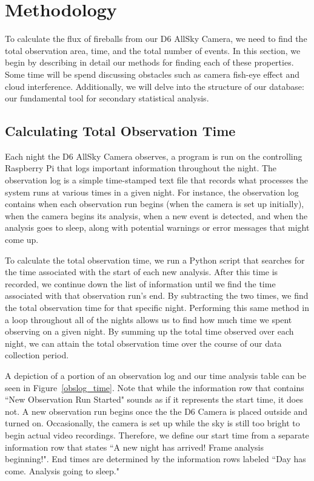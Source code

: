 

\chapter{Methodology}

To calculate the flux of fireballs from our D6 AllSky Camera, we need to find the total observation area, time, and the total number of events.
In this section, we begin by describing in detail our methods for finding each of these properties.
Some time will be spend discussing obstacles such as camera fish-eye effect and cloud interference.  
Additionally, we will delve into the structure of our database: our fundamental tool for secondary statistical analysis.

\section{Calculating Total Observation Time}

Each night the D6 AllSky Camera observes, a program is run on the controlling Raspberry Pi that logs important information throughout the night.
The observation log is a simple time-stamped text file that records what processes the system runs at various times in a given night.
For instance, the observation log contains when each observation run begins (when the camera is set up initially), when the camera begins its analysis, when a new event is detected, and when the analysis goes to sleep, along with potential warnings or error messages that might come up.

To calculate the total observation time, we run a Python script that searches for the time associated with the start of each new analysis.  
After this time is recorded, we continue down the list of information until we find the time associated with that observation run's end.  
By subtracting the two times, we find the total observation time for that specific night.  
Performing this same method in a loop throughout all of the nights allows us to find how much time we spent observing on a given night. 
By summing up the total time observed over each night, we can attain the total observation time over the course of our data collection period.

A depiction of a portion of an observation log and our time analysis table can be seen in Figure~\ref{obslog_time}.
Note that while the information row that contains ``New Observation Run Started" sounds as if it represents the start time, it does not.
A new observation run begins once the the D6 Camera is placed outside and turned on.  
Occasionally, the camera is set up while the sky is still too bright to begin actual video recordings. 
Therefore, we define our start time from a separate information row that states ``A new night has arrived! Frame analysis beginning!". 
End times are determined by the information rows labeled ``Day has come.  Analysis going to sleep."

